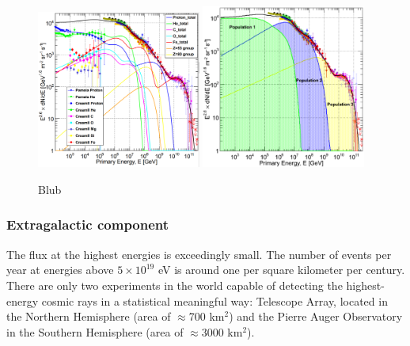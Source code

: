 \begin{figure}
\label{fig:fitsgaisser}
\centering
\includegraphics[width=0.48\textwidth]{chapter3/img/fit1gaisser.png}
\includegraphics[width=0.48\textwidth]{chapter3/img/fit2gaisser.png}
\caption{Blub}
\end{figure}

\subsubsection{Extragalactic component}
The flux at the highest energies is exceedingly small. The number of events per year at energies above $5 \times 10^{19}$ eV is around one per square kilometer per century. There are only two experiments in the world capable of detecting the highest-energy cosmic rays in a statistical meaningful way: Telescope Array, located in the Northern Hemisphere (area of $\approx$700 km$^2$) and the Pierre Auger Observatory in the Southern Hemisphere (area of $\approx$3000 km$^2$).

